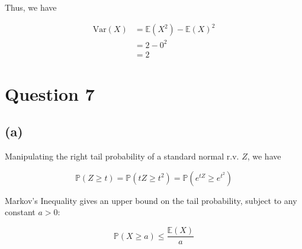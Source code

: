 \documentclass[12pt]{article}
\begin{document}
\noindent Thus, we have

\begin{align*}
    \text{Var}(X) &= \mathbb{E}(X^{2}) - \mathbb{E}(X)^{2} \\ 
    &= 2 - 0^{2} \\ 
    &= \boxed{2}
\end{align*}

\newpage

\section*{Question 7}

\subsection*{(a)}
Manipulating the right tail probability of a standard normal r.v. $Z$, we have 

\begin{equation}
    \mathbb{P}(Z \geq t) = \mathbb{P}(tZ \geq t^{2}) = \mathbb{P}(e^{tZ} \geq e^{t^{2}})
\end{equation}

\noindent Markov's Inequality gives an upper bound on the tail probability, subject to any constant $a > 0$:

\begin{equation}
    \mathbb{P}(X \geq a) \leq \frac{\mathbb{E}(X)}{a}
\end{equation} \\ 





\end{document}
